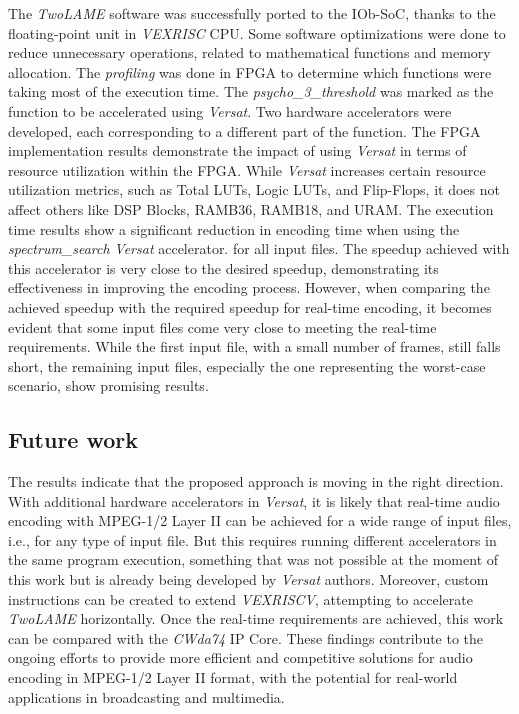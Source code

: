 The \textit{TwoLAME} software was successfully ported to the IOb-SoC, thanks to the floating-point unit in \textit{VEXRISC} CPU.
Some software optimizations were done to reduce unnecessary operations, related to mathematical functions and memory allocation.
The \textit{profiling} was done in FPGA to determine which functions were taking most of the execution time. The \textit{psycho\_3\_threshold} was marked as the function to be accelerated using \textit{Versat}.
Two hardware accelerators were developed, each corresponding to a different part of the function.
The FPGA implementation results demonstrate the impact of using \textit{Versat} in terms of resource utilization within the FPGA. While \textit{Versat} increases certain resource utilization metrics, such as Total LUTs, Logic LUTs, and Flip-Flops, it does not affect others like DSP Blocks, RAMB36, RAMB18, and URAM.
The execution time results show a significant reduction in encoding time when using the \textit{spectrum\_search} \textit{Versat} accelerator. for all input files. The speedup achieved with this accelerator is very close to the desired speedup, demonstrating its effectiveness in improving the encoding process.
However, when comparing the achieved speedup with the required speedup for real-time encoding, it becomes evident that some input files come very close to meeting the real-time requirements. While the first input file, with a small number of frames, still falls short, the remaining input files, especially the one representing the worst-case scenario, show promising results.

\subsection{Future work}

The results indicate that the proposed approach is moving in the right direction. With additional hardware accelerators in \textit{Versat}, it is likely that real-time audio encoding with MPEG-1/2 Layer II can be achieved for a wide range of input files, i.e., for any type of input file. But this requires running different accelerators in the same program execution, something that was not possible at the moment of this work but is already being developed by \textit{Versat} authors. 
Moreover, custom instructions can be created to extend \textit{VEXRISCV}, attempting to accelerate \textit{TwoLAME} horizontally.
Once the real-time requirements are achieved, this work can be compared with the  \textit{CWda74} IP Core.
These findings contribute to the ongoing efforts to provide more efficient and competitive solutions for audio encoding in MPEG-1/2 Layer II format, with the potential for real-world applications in broadcasting and multimedia.